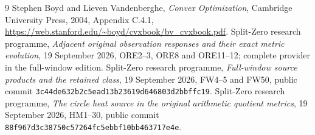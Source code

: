 \documentclass[11pt]{article}
\begin{document}
\begin{thebibliography}{9}
 Stephen Boyd and Lieven Vandenberghe,
\emph{Convex Optimization}, Cambridge University Press, 2004,
Appendix C.4.1,
\url{https://web.stanford.edu/~boyd/cvxbook/bv_cvxbook.pdf}.
 Split-Zero research programme,
\emph{Adjacent original observation responses and their exact metric
evolution}, 19 September 2026, ORE2--3, ORE8 and ORE11--12;
complete provider in the full-window edition.
 Split-Zero research programme,
\emph{Full-window source products and the retained class},
19 September 2026, FW4--5 and FW50, public commit
\texttt{3c44de632b2c5ead13b23619d646803d2bbffc19}.
 Split-Zero research programme,
\emph{The circle heat source in the original arithmetic quotient metrics},
19 September 2026, HM1--30, public commit
\texttt{88f967d3c38750c57264fc5ebbf10bb463717e4e}.
\end{thebibliography}
\end{document}

